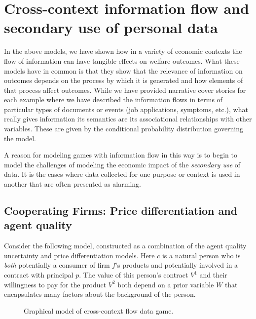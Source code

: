 \documentclass[../thesis.tex]{subfiles}
\begin{document}
\section{Cross-context information flow and secondary use of personal data}
\label{sec:cross-context}

In the above models, we have shown how in
a variety of economic contexts the flow of information
can have tangible effects on welfare outcomes.
What these models have in common is that they show
that the relevance of information on outcomes depends
on the process by which it is generated and how
elements of that process affect outcomes.
While we have provided narrative cover stories for
each example where we have described the information
flows in terms of particular types of documents or events
(job applications, symptoms, etc.), what really gives
information its semantics are its associational
relationships with other variables.
These are given by the conditional probability
distribution governing the model.

A reason for modeling games with information flow in
this way is to begin to model the challenges of modeling
the economic impact of the \emph{secondary use} of data.
It is the cases where data collected for one purpose or context
is used in another that are often presented as alarming.

\subsection{Cooperating Firms: Price differentiation and agent quality}
\label{sec:cooperating-firms}

Consider the following model, constructed as a combination
of the agent quality uncertainty and price differentiation
models.
Here $c$ is a natural person who is \emph{both} potentially
a consumer of firm $f$'s products and potentially involved
in a contract with principal $p$.
The value of this person's contract $V^1$ and their
willingness to pay for the product $V^2$ both depend on
a prior variable $W$ that encapsulates many factors about
the background of the person.

\begin{figure}
\begin{center}
\end{center}
\caption{Graphical model of cross-context flow data game.}
\end{figure}
\end{document}
